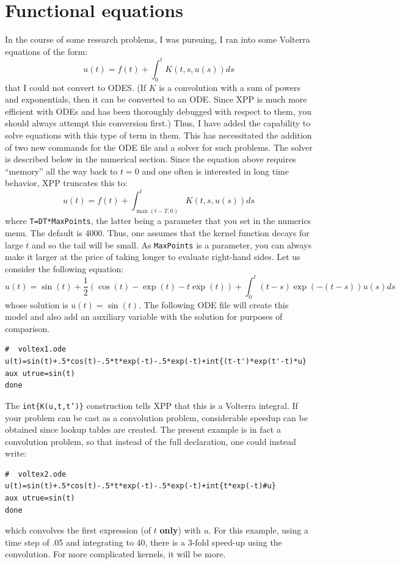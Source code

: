 \documentclass{article}
\begin{document}
 
\section{Functional equations}
In the course of some research problems, I was pursuing, I ran into
some Volterra equations of the form:
\[
	u(t)=f(t)+\int_0^t K(t,s,u(s))ds
\]
that I could not convert to ODES.  (If $K$ is a convolution with a 
sum of powers and
exponentials, then it can be converted to an ODE.  Since XPP is much
more efficient with ODEs and has been thoroughly debugged with respect
to them, you should always attempt this conversion first.)  Thus, I
have added the capability to solve equations with this type of term in
them.  This has necessitated the addition of two new commands for the
ODE file and a solver for such problems. The solver is
described below in the numerical section.  Since the equation above
requires ``memory'' all the way back to $t=0$ and one often is
interested in long time behavior, XPP truncates this to:
\[
	u(t)=f(t)+\int_{\max(t-T,0)}^t K(t,s,u(s))ds
\]
where {\tt T=DT*MaxPoints}, the latter being a parameter that you
set in the numerics menu.  The default is 4000.  Thus, one
assumes that the kernel function decays for large $t$ and so the tail
will be small.  As {\tt MaxPoints} is a parameter, you can always make
it larger at the price of taking longer to evaluate right-hand sides.
Let us consider
the following equation:
\[
 u(t) = \sin(t)+\frac{1}{2}(\cos(t)-\exp(t)-t\exp(t))+\int_0^t
(t-s)\exp(-(t-s))u(s)ds
\]
whose solution is $u(t)=\sin(t).$  The following ODE file will create
this model and also add an auxiliary variable with the solution for
purposes of comparison.
\begin{verbatim}
#  voltex1.ode
u(t)=sin(t)+.5*cos(t)-.5*t*exp(-t)-.5*exp(-t)+int{(t-t')*exp(t'-t)*u}
aux utrue=sin(t)
done
\end{verbatim}
The {\tt int\{K(u,t,t')\}} construction tells XPP that this is a
Volterra integral. If your problem can be
cast as a convolution problem, considerable speedup can be obtained
since lookup tables are created.  The present example is
in fact a convolution problem, so that instead of the full
declaration, one could instead write:
\begin{verbatim}
#  voltex2.ode
u(t)=sin(t)+.5*cos(t)-.5*t*exp(-t)-.5*exp(-t)+int{t*exp(-t)#u}
aux utrue=sin(t)
done
\end{verbatim}
which convolves the first expression (of $t$ {\bf only}) with $u.$ For
this example, using a time step of .05 and integrating to 40, there is
a 3-fold speed-up using the convolution.  For more complicated
kernels, it will be more.  
\end{document}
